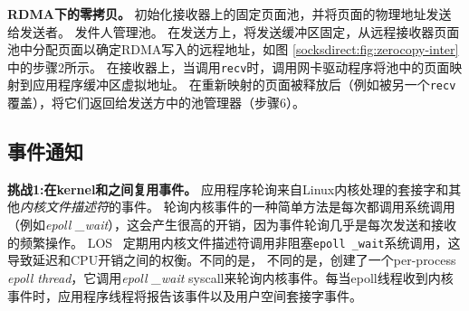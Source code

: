 \textbf {RDMA下的零拷贝。}
\libipc {}初始化接收器上的固定页面池，并将页面的物理地址发送给发送者。
发件人管理池。
在发送方上，\libipc {}将发送缓冲区固定，从远程接收器页面池中分配页面以确定RDMA写入的远程地址，如图 \ref {socksdirect:fig:zerocopy-inter}中的步骤2所示。
在接收器上，当调用\texttt {recv}时，\libipc 调用网卡驱动程序将池中的页面映射到应用程序缓冲区虚拟地址。
在重新映射的页面被释放后（例如被另一个\texttt {recv}覆盖），\libipc {}将它们返回给发送方中的池管理器（步骤6）。


%

\subsection{事件通知}
\label{socksdirect:subsec:process-mux}

\textbf {挑战1:在kernel和\libipc {}之间复用事件。}
应用程序轮询来自Linux内核处理的套接字和其他\textit {内核文件描述符}的事件。
轮询内核事件的一种简单方法是每次都调用系统调用（例如\textit {epoll \_wait}），这会产生很高的开销，因为事件轮询几乎是每次发送和接收的频繁操作。
LOS~ \cite {huang2017high}定期用内核文件描述符调用非阻塞\texttt {epoll \_wait}系统调用，这导致延迟和CPU开销之间的权衡。不同的是，
不同的是，\libipc {}创建了一个per-process \textit {epoll thread}，它调用\textit {epoll \_wait} syscall来轮询内核事件。每当epoll线程收到内核事件时，应用程序线程将报告该事件以及用户空间套接字事件。

